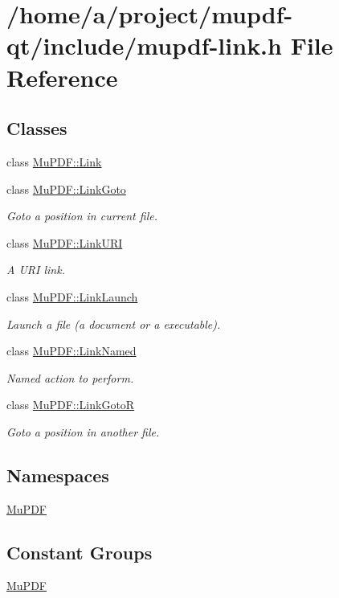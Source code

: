 \hypertarget{mupdf-link_8h}{\section{/home/a/project/mupdf-\/qt/include/mupdf-\/link.h File Reference}
\label{mupdf-link_8h}
}
\subsection*{Classes}
\begin{DoxyCompactItemize}
\item 
class \hyperlink{class_mu_p_d_f_1_1_link}{Mu\-P\-D\-F\-::\-Link}
\item 
class \hyperlink{class_mu_p_d_f_1_1_link_goto}{Mu\-P\-D\-F\-::\-Link\-Goto}
\begin{DoxyCompactList}\small\item\em Goto a position in current file. \end{DoxyCompactList}\item 
class \hyperlink{class_mu_p_d_f_1_1_link_u_r_i}{Mu\-P\-D\-F\-::\-Link\-U\-R\-I}
\begin{DoxyCompactList}\small\item\em A U\-R\-I link. \end{DoxyCompactList}\item 
class \hyperlink{class_mu_p_d_f_1_1_link_launch}{Mu\-P\-D\-F\-::\-Link\-Launch}
\begin{DoxyCompactList}\small\item\em Launch a file (a document or a executable). \end{DoxyCompactList}\item 
class \hyperlink{class_mu_p_d_f_1_1_link_named}{Mu\-P\-D\-F\-::\-Link\-Named}
\begin{DoxyCompactList}\small\item\em Named action to perform. \end{DoxyCompactList}\item 
class \hyperlink{class_mu_p_d_f_1_1_link_goto_r}{Mu\-P\-D\-F\-::\-Link\-Goto\-R}
\begin{DoxyCompactList}\small\item\em Goto a position in another file. \end{DoxyCompactList}\end{DoxyCompactItemize}
\subsection*{Namespaces}
\begin{DoxyCompactItemize}
\item 
\hyperlink{namespace_mu_p_d_f}{Mu\-P\-D\-F}
\end{DoxyCompactItemize}
\subsection*{Constant Groups}
\begin{DoxyCompactItemize}
\item 
\hyperlink{namespace_mu_p_d_f}{Mu\-P\-D\-F}
\end{DoxyCompactItemize}
